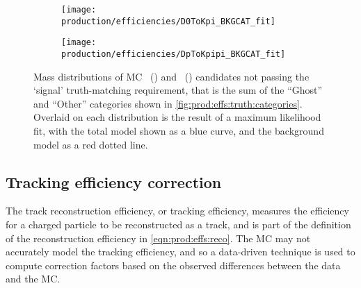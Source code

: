 \begin{figure}
  \begin{subfigure}[b]{0.5\textwidth}
    \centering
    \texttt{[image: production/efficiencies/D0ToKpi\_BKGCAT\_fit]}
    \caption{\DzToKpi}
    \label{fig:prod:effs:truth:fit:D0ToKpi}
  \end{subfigure}
  \begin{subfigure}[b]{0.5\textwidth}
    \centering
    \texttt{[image: production/efficiencies/DpToKpipi\_BKGCAT\_fit]}
    \caption{\DpToKpipi}
    \label{fig:prod:effs:truth:fit:DpToKpipi}
  \end{subfigure}
  \caption{%
    Mass distributions of \ac{MC} 
    \PDzero~() and 
    \PDplus~() candidates not 
    passing the `signal' truth-matching requirement, that is the sum of the 
    ``Ghost'' and ``Other'' categories shown in 
    \cref{fig:prod:effs:truth:categories}.
    Overlaid on each distribution is the result of a maximum likelihood fit, 
    with the total model shown as a blue curve, and the background model as a 
    red dotted line.
  }
  \label{fig:prod:effs:truth:fit}
\end{figure}

\subsection{Tracking efficiency correction}
\label{chap:prod:effs:tracking}

The track reconstruction efficiency, or tracking efficiency, measures the 
efficiency for a charged particle to be reconstructed as a track, and is part 
of the definition of the reconstruction efficiency in 
\cref{eqn:prod:effs:reco}.
The \ac{MC} may not accurately model the tracking efficiency, and so a 
data-driven technique is used to compute correction factors based on the 
observed differences between the data and the \ac{MC}.


